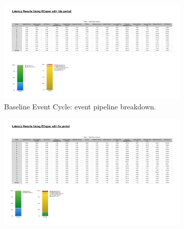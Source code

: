 \begin{figure}[ht!]
  \centering
  \begin{subfigure}{.5\textwidth}
    \centering
    \includegraphics[height=\linewidth]{./images/edge_ecspec_effective_breakdown}
    \caption{Baseline Event Cycle: event pipeline breakdown.}
    \label{fig:ecspec_effective_base}
  \end{subfigure}%
  \begin{subfigure}{.5\textwidth}
    \centering
    \includegraphics[height=\linewidth]{./images/edge_ecspecf_effective_breakdown}

\end{subfigure}
\end{figure}
